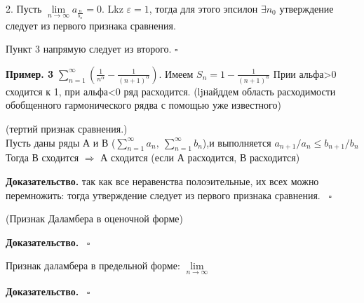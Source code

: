 2. Пусть $\lim\limits_{n \to \infty} a_\frac{n}{b_n}=0$. Lkz $\varepsilon=1$, 
тогда для этого эпсилон  $\exists n_0$ утверждение следует из первого
признака сравнения. 

Пункт 3 напрямую следует из второго.
$\square$ 

\textbf{Пример. 3}  $\sum\limits_{n=1}^{\infty}(\frac{1}{n^\alpha}-
\frac{1}{(n+1)^\alpha})$. Имеем $S_n=1-\frac{1}{(n+1)^\alpha}$ Прии 
альфа>0 сходится к 1, при альфа<0 ряд расходится.
(ljнайддем область расходимости обобщенного гармонического
рядва с помощью уже известного)

\begin{theor}
    (тертий признак сравнения.)\\
Пусть даны ряды А и В ($\sum\limits_{n=1}^{\infty} a_n,~\sum
\limits_{n=1}^{\infty} b_n$),и выполняется $a_{n+1}/a_n\leqslant b_{n+1}/b_n$
Тогда В сходится $\Rightarrow$ А сходится
(если А расходится, В расходится)

\end{theor}
\textbf{Доказательство.}  так как все неравенства полоэительные, их всех можно
перемножить: тогда утверждение следует из первого признака сравнения. 
\
$\square$ 

\begin{theor}
    (Признак Даламбера в оценочной форме)\\
\end{theor}
\textbf{Доказательство.}  \
$\square$ 

\begin{theor}
Признак даламбера в предельной форме: $\lim\limits_{n \to \infty} $
\end{theor}
\textbf{Доказательство.}  \
$\square$ 


















